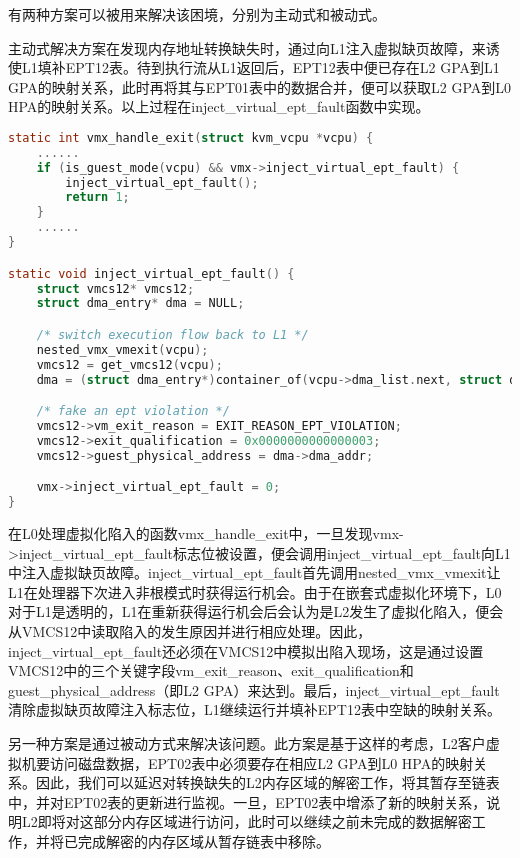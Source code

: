 有两种方案可以被用来解决该困境，分别为主动式和被动式。

主动式解决方案在发现内存地址转换缺失时，通过向L1注入虚拟缺页故障，来诱使L1填补EPT12表。待到执行流从L1返回后，EPT12表中便已存在L2 GPA到L1 GPA的映射关系，此时再将其与EPT01表中的数据合并，便可以获取L2 GPA到L0 HPA的映射关系。以上过程在inject\_virtual\_ept\_fault函数中实现。

\begin{lstlisting}[language={C}, caption={inject\_virtual\_ept\_fault函数实现源码}]
static int vmx_handle_exit(struct kvm_vcpu *vcpu) {
    ......
    if (is_guest_mode(vcpu) && vmx->inject_virtual_ept_fault) {
        inject_virtual_ept_fault();
        return 1;
    }
    ......
}

static void inject_virtual_ept_fault() {	
    struct vmcs12* vmcs12;
    struct dma_entry* dma = NULL;

    /* switch execution flow back to L1 */
    nested_vmx_vmexit(vcpu);
    vmcs12 = get_vmcs12(vcpu);
    dma = (struct dma_entry*)container_of(vcpu->dma_list.next, struct dma_entry, next_entry);

    /* fake an ept violation */
    vmcs12->vm_exit_reason = EXIT_REASON_EPT_VIOLATION;
    vmcs12->exit_qualification = 0x0000000000000003;
    vmcs12->guest_physical_address = dma->dma_addr;

    vmx->inject_virtual_ept_fault = 0;
}
\end{lstlisting}

在L0处理虚拟化陷入的函数vmx\_handle\_exit中，一旦发现vmx->inject\_vi\-rtual\_ept\_fault标志位被设置，便会调用inject\_virtual\_ept\_fault向L1中注入虚拟缺页故障。inject\_virtual\_ept\_fault首先调用nested\_vmx\_vmexit让L1在处理器下次进入非根模式时获得运行机会。由于在嵌套式虚拟化环境下，L0对于L1是透明的，L1在重新获得运行机会后会认为是L2发生了虚拟化陷入，便会从VMCS12中读取陷入的发生原因并进行相应处理。因此，inject\_virtual\_ept\_fault还必须在VMCS12中模拟出陷入现场，这是通过设置VMCS12中的三个关键字段vm\_exit\_reason、exit\_qualification和guest\_physical\_address（即L2 GPA）来达到。最后，inject\_virtual\_ept\_fault清除虚拟缺页故障注入标志位，L1继续运行并填补EPT12表中空缺的映射关系。

另一种方案是通过被动方式来解决该问题。此方案是基于这样的考虑，L2客户虚拟机要访问磁盘数据，EPT02表中必须要存在相应L2 GPA到L0 HPA的映射关系。因此，我们可以延迟对转换缺失的L2内存区域的解密工作，将其暂存至链表中，并对EPT02表的更新进行监视。一旦，EPT02表中增添了新的映射关系，说明L2即将对这部分内存区域进行访问，此时可以继续之前未完成的数据解密工作，并将已完成解密的内存区域从暂存链表中移除。

